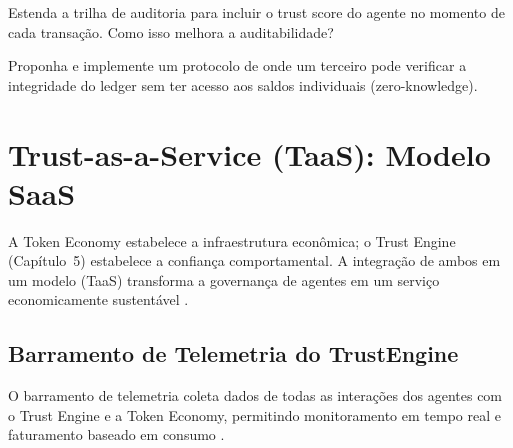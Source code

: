 \begin{exercicio}
Estenda a trilha de auditoria para incluir o trust score do
agente no momento de cada transação. Como isso melhora a
auditabilidade?
\end{exercicio}

\begin{exercicio}
Proponha e implemente um protocolo de  onde um terceiro pode verificar a integridade do
ledger sem ter acesso aos saldos individuais (zero-knowledge).
\end{exercicio}

\section{Trust-as-a-Service (TaaS): Modelo SaaS}
\label{sec:taas}
\nivelphd

A Token Economy estabelece a infraestrutura econômica; o Trust
Engine (Capítulo~5) estabelece a confiança comportamental. A
integração de ambos em um modelo 
(TaaS) transforma a governança de agentes em um serviço
economicamente sustentável \cite{opencode2026token,
opencode2026ecosystem}.

\subsection{Barramento de Telemetria do TrustEngine}

O barramento de telemetria coleta dados de todas as interações
dos agentes com o Trust Engine e a Token Economy, permitindo
monitoramento em tempo real e faturamento baseado em consumo
\cite{opencode2026spec038}.

